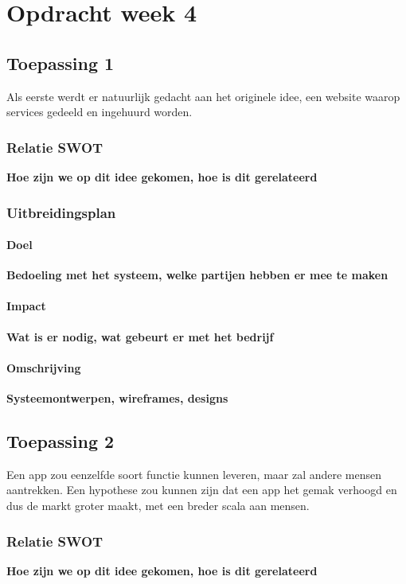 \chapter{Opdracht week 4}

\section{Toepassing 1}

Als eerste werdt er natuurlijk gedacht aan het originele idee,
een website waarop services gedeeld en ingehuurd worden.

\subsection{Relatie SWOT}
{\bf Hoe zijn we op dit idee gekomen, hoe is dit gerelateerd}

\subsection{Uitbreidingsplan}

\subsubsection{Doel}
{\bf Bedoeling met het systeem, welke partijen hebben er mee te maken}

\subsubsection{Impact}
{\bf Wat is er nodig, wat gebeurt er met het bedrijf}

\subsubsection{Omschrijving}
{\bf Systeemontwerpen, wireframes, designs}

\section{Toepassing 2}

Een app zou eenzelfde soort functie kunnen leveren,
maar zal andere mensen aantrekken.
Een hypothese zou kunnen zijn dat een app het gemak verhoogd
en dus de markt groter maakt,
met een breder scala aan mensen.

\subsection{Relatie SWOT}
{\bf Hoe zijn we op dit idee gekomen, hoe is dit gerelateerd}

